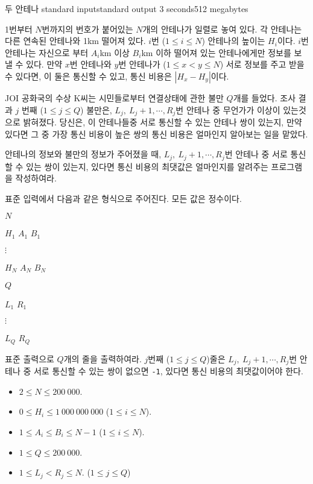 \begin{problem}{두 안테나}
	{standard input}{standard output}
	{3 seconds}{512 megabytes}{}
	
	1번부터 $N$번까지의 번호가 붙어있는 $N$개의 안테나가 일렬로 놓여 있다. 각 안테나는 다른 연속된 안테나와 1km 떨어져 있다. $i$번 ($1 \le i \le N$) 안테나의 높이는 $H_i$이다. $i$번 안테나는 자신으로 부터 $A_i$km 이상 $B_i$km 이하 떨어져 있는 안테나에게만 정보를 보낼 수 있다. 만약 $x$번 안테나와 $y$번 안테나가 ($1 \le x < y \le N$) 서로 정보를 주고 받을 수 있다면, 이 둘은 통신할 수 있고, 통신 비용은 $|H_x - H_y|$이다.
	
	JOI 공화국의 수상 K씨는 시민들로부터 연결상태에 관한 불만 $Q$개를 들었다. 조사 결과 $j$ 번째 ($1 \le j \le Q$) 불만은, $L_j, \ L_j +1, \cdots, R_j$번 안테나 중 무언가가 이상이 있는것으로 밝혀졌다. 당신은, 이 안테나들중 서로 통신할 수 있는 안테나 쌍이 있는지, 만약 있다면 그 중 가장 통신 비용이 높은 쌍의 통신 비용은 얼마인지 알아보는 일을 맡았다.
	
	안테나의 정보와 불만의 정보가 주어졌을 때, $L_j, \ L_j +1, \cdots, R_j$번 안테나 중 서로 통신할 수 있는 쌍이 있는지, 있다면 통신 비용의 최댓값은 얼마인지를 알려주는 프로그램을 작성하여라.
	
	\InputFile
	
	표준 입력에서 다음과 같은 형식으로 주어진다. 모든 값은 정수이다.

	$N$
	
	$H_1$ $A_1$ $B_1$
	
	$\vdots$
	
	$H_N$ $A_N$ $B_N$

	$Q$
	
	$L_1$ $R_1$
	
	$\vdots$
	
	$L_Q$ $R_Q$
	
	\OutputFile
	
	표준 출력으로 $Q$개의 줄을 출력하여라. $j$번째 ($1 \le j \le Q$)줄은 $L_j, \ L_j +1, \cdots, R_j$번 안테나 중 서로 통신할 수 있는 쌍이 없으면 \texttt{-1}, 있다면 통신 비용의 최댓값이어야 한다.
	
	\Constraints
	
	\begin{itemize}
	
	\item $2 \le N \le 200\ 000$.
	\item $0 \le H_i \le 1\ 000\ 000\ 000$ ($1 \le i \le N$).
	\item $1 \le A_i \le B_i \le N-1$ ($1 \le i \le N$).
	\item $1 \le Q \le 200\ 000$.
	\item $1 \le L_j < R_j \le N$. ($1 \le j \le Q$)
		

\end{itemize}
\end{problem}
